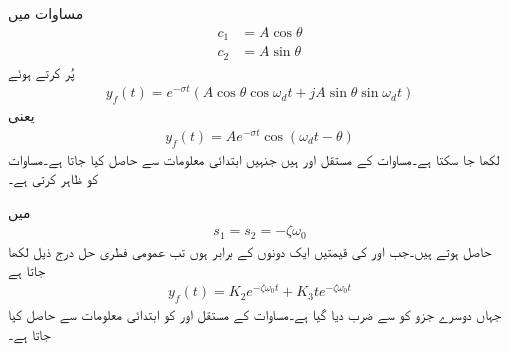 مساوات  میں
\begin{align*}
c_1&=A \cos \theta\\
c_2&=A\sin \theta
\end{align*}
پُر کرتے ہوئے
\begin{align*}
y_f(t)=e^{-\sigma t} \left(A \cos \theta \cos \omega_d t +j A \sin \theta \sin \omega_d t\right)
\end{align*}
یعنی
\begin{align}\label{مساوات_عارضی_فطری_حل_کم_تقصیر_ب}
y_f(t)=Ae^{-\sigma t} \cos(\omega_d t -\theta)
\end{align}
لکھا جا سکتا ہے۔مساوات  کے مستقل  اور  ہیں جنہیں ابتدائی معلومات سے حاصل کیا جاتا ہے۔مساوات    کو ظاہر کرتی ہے۔

  میں
\begin{align}
s_1=s_2=-\zeta \omega_0
\end{align}
حاصل ہوتے ہیں۔جب  اور  کی قیمتیں ایک دونوں کے برابر  ہوں تب عمومی فطری حل درج ذیل لکھا جاتا ہے
\begin{align}
y_f(t)=K_2 e^{-\zeta \omega_0 t}+K_3 t e^{-\zeta \omega_0 t}
\end{align}
جہاں دوسرے جزو کو  سے ضرب دیا گیا ہے۔مساوات کے مستقل  اور  کو ابتدائی معلومات سے حاصل کیا جاتا ہے۔
